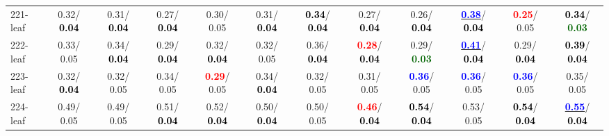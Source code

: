 \begin{table}[h]
\begin{center}
{\begin{tabular}{lc|c|c|c|c|c|c|c|c|c|c}
221-leaf &   0.32/\textcolor{black}{\textbf{  0.04}} &   0.31/\textcolor{black}{\textbf{  0.04}} &   0.27/\textcolor{black}{\textbf{  0.04}} &   0.30/  0.05 &   0.31/\textcolor{black}{\textbf{  0.04}} & \textcolor{black}{\textbf{  0.34}}/\textcolor{black}{\textbf{  0.04}} &   0.27/\textcolor{black}{\textbf{  0.04}} &   0.26/\textcolor{black}{\textbf{  0.04}} & \underline{\textcolor{blue}{\textbf{  0.38}}}/\textcolor{black}{\textbf{  0.04}} & \textcolor{red}{\textbf{  0.25}}/  0.05 & \textcolor{black}{\textbf{  0.34}}/\textcolor{darkgreen}{\textbf{  0.03}} \\
222-leaf &   0.33/  0.05 &   0.34/\textcolor{black}{\textbf{  0.04}} &   0.29/\textcolor{black}{\textbf{  0.04}} &   0.32/\textcolor{black}{\textbf{  0.04}} &   0.32/  0.05 &   0.36/\textcolor{black}{\textbf{  0.04}} & \textcolor{red}{\textbf{  0.28}}/\textcolor{black}{\textbf{  0.04}} &   0.29/\textcolor{darkgreen}{\textbf{  0.03}} & \underline{\textcolor{blue}{\textbf{  0.41}}}/\textcolor{black}{\textbf{  0.04}} &   0.29/\textcolor{black}{\textbf{  0.04}} & \textcolor{black}{\textbf{  0.39}}/\textcolor{black}{\textbf{  0.04}} \\
223-leaf &   0.32/\textcolor{black}{\textbf{  0.04}} &   0.32/  0.05 &   0.34/  0.05 & \textcolor{red}{\textbf{  0.29}}/  0.05 &   0.34/\textcolor{black}{\textbf{  0.04}} &   0.32/  0.05 &   0.31/  0.05 & \textcolor{blue}{\textbf{  0.36}}/  0.05 & \textcolor{blue}{\textbf{  0.36}}/  0.05 & \textcolor{blue}{\textbf{  0.36}}/  0.05 &   0.35/  0.05 \\
224-leaf &   0.49/  0.05 &   0.49/  0.05 &   0.51/\textcolor{black}{\textbf{  0.04}} &   0.52/\textcolor{black}{\textbf{  0.04}} &   0.50/\textcolor{black}{\textbf{  0.04}} &   0.50/  0.05 & \textcolor{red}{\textbf{  0.46}}/\textcolor{black}{\textbf{  0.04}} & \textcolor{black}{\textbf{  0.54}}/\textcolor{black}{\textbf{  0.04}} &   0.53/  0.05 & \textcolor{black}{\textbf{  0.54}}/\textcolor{black}{\textbf{  0.04}} & \underline{\textcolor{blue}{\textbf{  0.55}}}/\textcolor{black}{\textbf{  0.04}} \\\end{tabular}}\label{stratsALCKappa6AllReduxHalfa}
\end{center}
\end{table}
